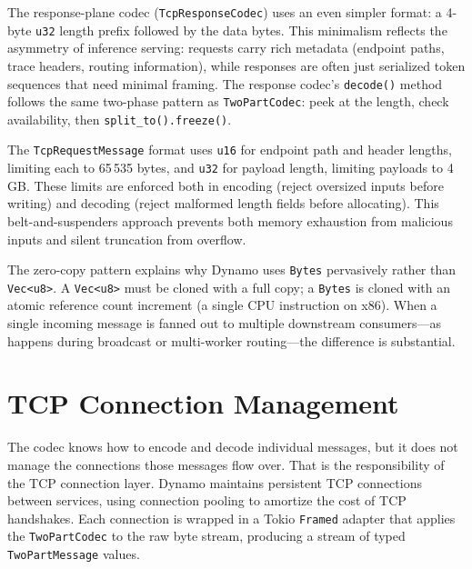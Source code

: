 The response-plane codec (\texttt{TcpResponseCodec}) uses an even simpler format: a 4-byte \texttt{u32} length prefix followed by the data bytes. This minimalism reflects the asymmetry of inference serving: requests carry rich metadata (endpoint paths, trace headers, routing information), while responses are often just serialized token sequences that need minimal framing. The response codec's \texttt{decode()} method follows the same two-phase pattern as \texttt{TwoPartCodec}: peek at the length, check availability, then \texttt{split\_to().freeze()}.

\begin{notebox}
The \texttt{TcpRequestMessage} format uses \texttt{u16} for endpoint path and header lengths, limiting each to 65\,535 bytes, and \texttt{u32} for payload length, limiting payloads to 4\,GB. These limits are enforced both in encoding (reject oversized inputs before writing) and decoding (reject malformed length fields before allocating). This belt-and-suspenders approach prevents both memory exhaustion from malicious inputs and silent truncation from overflow.
\end{notebox}

\begin{insightbox}
The zero-copy pattern explains why Dynamo uses \texttt{Bytes} pervasively rather than \texttt{Vec<u8>}. A \texttt{Vec<u8>} must be cloned with a full copy; a \texttt{Bytes} is cloned with an atomic reference count increment (a single CPU instruction on x86). When a single incoming message is fanned out to multiple downstream consumers---as happens during broadcast or multi-worker routing---the difference is substantial.
\end{insightbox}

\section{TCP Connection Management}
\label{sec:codecs:tcp}

%
The codec knows how to encode and decode individual messages, but it does not manage the connections those messages flow over. That is the responsibility of the TCP connection layer. Dynamo maintains persistent TCP connections between services, using connection pooling to amortize the cost of TCP handshakes. Each connection is wrapped in a Tokio \texttt{Framed} adapter that applies the \texttt{TwoPartCodec} to the raw byte stream, producing a stream of typed \texttt{TwoPartMessage} values.

